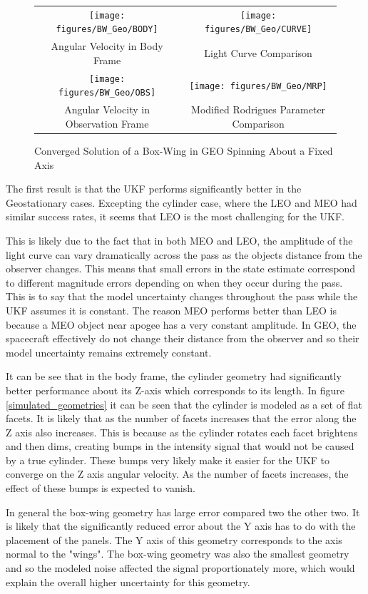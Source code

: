 \begin{figure}
	\begin{tabular}{cc}
		\texttt{[image: figures/BW\_Geo/BODY]} &
		\texttt{[image: figures/BW\_Geo/CURVE]} \\
		Angular Velocity in Body Frame & Light Curve Comparison \\
		\texttt{[image: figures/BW\_Geo/OBS]} &
		\texttt{[image: figures/BW\_Geo/MRP]} \\
		Angular Velocity in Observation Frame & Modified Rodrigues Parameter Comparison
	\end{tabular}
	\caption{Converged Solution of a Box-Wing in GEO Spinning About a Fixed Axis}
\end{figure}

The first result is that the UKF performs significantly better in the Geostationary cases. Excepting the cylinder case, where the LEO and MEO had similar success rates, it seems that LEO is the most challenging for the UKF.

This is likely due to the fact that in both MEO and LEO, the amplitude of the light curve can vary dramatically across the pass as the objects distance from the observer changes. This means that small errors in the state estimate correspond to different magnitude errors depending on when they occur during the pass. This is to say that the model uncertainty changes throughout the pass while the UKF assumes it is constant. The reason MEO performs better than LEO is because a MEO object near apogee has a very constant amplitude. In GEO, the spacecraft effectively do not change their distance from the observer and so their model uncertainty remains extremely constant.

It can be see that in the body frame, the cylinder geometry had significantly better performance about its Z-axis which corresponds to its length. In figure \ref{simulated_geometries} it can be seen that the cylinder is modeled as a set of flat facets. It is likely that as the number of facets increases that the error along the Z axis also increases. This is because as the cylinder rotates each facet brightens and then dims, creating bumps in the intensity signal that would not be caused by a true cylinder. These bumps very likely make it easier for the UKF to converge on the Z axis angular velocity. As the number of facets increases, the effect of these bumps is expected to vanish.

In general the box-wing geometry has large error compared two the other two. It is likely that the significantly reduced error about the Y axis has to do with the placement of the panels. The Y axis of this geometry corresponds to the axis normal to the "wings". The box-wing geometry was also the smallest geometry and so the modeled noise affected the signal proportionately more, which would explain the overall higher uncertainty for this geometry.

